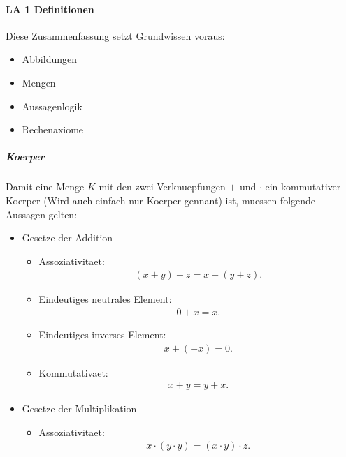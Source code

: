 \documentclass[12pt]{article}
\begin{document}
\paragraph{\Large LA 1 Definitionen}
\begin{flushleft}
    Diese Zusammenfassung setzt Grundwissen voraus:
    \begin{itemize}
        \item Abbildungen
        \item Mengen
        \item Aussagenlogik
        \item Rechenaxiome
    \end{itemize}
\end{flushleft}
\vspace{1cm}
\subparagraph{\large Koerper}
\normalsize
\begin{flushleft}
    Damit eine Menge $K$ mit den zwei Verknuepfungen $+$ und $\cdot$ ein kommutativer Koerper (Wird auch einfach nur Koerper gennant) ist, muessen folgende Aussagen gelten:
    \begin{itemize}
        \item Gesetze der Addition
        \begin{itemize}
            \item Assoziativitaet: \begin{align*}
                (x + y) + z = x + (y + z).
            \end{align*}
            \item Eindeutiges neutrales Element: \begin{align*}
                0 + x = x.
            \end{align*}
            \item Eindeutiges inverses Element: \begin{align*}
                x + (-x) = 0.
            \end{align*}
            \item Kommutativaet: \begin{align*}
                x + y = y + x.
            \end{align*}
        \end{itemize}
        \item Gesetze der Multiplikation
        \begin{itemize}
            \item Assoziativitaet: \begin{align*}
                x \cdot (y \cdot y) = (x \cdot y) \cdot z.

\end{align*}
\end{itemize}
\end{itemize}
\end{flushleft}
\end{document}
